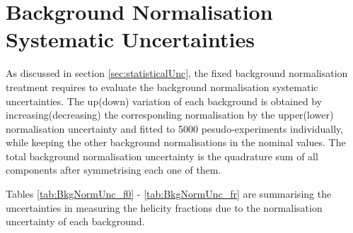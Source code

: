 \clearpage
\section{Background Normalisation Systematic Uncertainties}
\label{app:bkgNormSyst}
As discussed in section \ref{sec:statisticalUnc}, the fixed background normalisation treatment requires to evaluate the background normalisation systematic uncertainties. The up(down) variation of each background is obtained by increasing(decreasing) the corresponding normalisation by the upper(lower) normalisation uncertainty and fitted to 5000 pesudo-experiments individually, while keeping the other background normalisations in the nominal values. The total background normalisation uncertainty is the quadrature sum of all components after symmetrising each one of them.

Tables \ref{tab:BkgNormUnc_f0} - \ref{tab:BkgNormUnc_fr} are summarising the uncertainties in measuring the helicity fractions due to the normalisation uncertainty of each background.  

